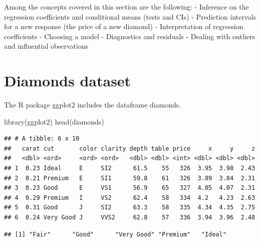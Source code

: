 \documentclass[
]{book}
\newenvironment{Shaded}{\begin{snugshade}}{\end{snugshade}}
\newcommand{\FunctionTok}[1]{\textcolor[rgb]{0.00,0.00,0.00}{#1}}
\newcommand{\NormalTok}[1]{#1}
\newcommand{\SpecialCharTok}[1]{\textcolor[rgb]{0.00,0.00,0.00}{#1}}
\begin{document}
Among the concepts covered in this section are the following:
- Inference on the regression coefficients and conditional means (tests and CIs)
- Prediction intervals for a new response (the price of a new diamond)
- Interpretation of regression coefficients
- Choosing a model
- Diagnostics and residuals
- Dealing with outliers and influential observations

\hypertarget{diamonds-dataset}{%
\section{Diamonds dataset}\label{diamonds-dataset}}

The R package ggplot2 includes the dataframe diamonds.

\begin{Shaded}
\begin{Highlighting}[]
\FunctionTok{library}\NormalTok{(ggplot2)}
\FunctionTok{head}\NormalTok{(diamonds)}
\end{Highlighting}
\end{Shaded}

\begin{verbatim}
## # A tibble: 6 x 10
##   carat cut       color clarity depth table price     x     y     z
##   <dbl> <ord>     <ord> <ord>   <dbl> <dbl> <int> <dbl> <dbl> <dbl>
## 1  0.23 Ideal     E     SI2      61.5    55   326  3.95  3.98  2.43
## 2  0.21 Premium   E     SI1      59.8    61   326  3.89  3.84  2.31
## 3  0.23 Good      E     VS1      56.9    65   327  4.05  4.07  2.31
## 4  0.29 Premium   I     VS2      62.4    58   334  4.2   4.23  2.63
## 5  0.31 Good      J     SI2      63.3    58   335  4.34  4.35  2.75
## 6  0.24 Very Good J     VVS2     62.8    57   336  3.94  3.96  2.48
\end{verbatim}

\begin{Shaded}
\end{Shaded}

\begin{verbatim}
## [1] "Fair"      "Good"      "Very Good" "Premium"   "Ideal"
\end{verbatim}

\begin{Shaded}
\end{Shaded}
\end{document}
